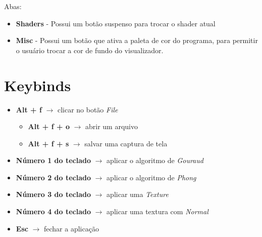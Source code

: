 \documentclass{ol-softwaremanual}
\begin{document}
Abas: 
\begin{itemize}
    \item \textbf{Shaders} - Possui um botão suspenso para 
    trocar o shader atual 
    \item \textbf{Misc} - Possui um botão que ativa a paleta de cor 
    do programa, para permitir o usuário trocar a cor 
    de fundo do visualizador.
\end{itemize}

\section{Keybinds}

\begin{itemize}
    \item \textbf{Alt + f} $\rightarrow$ clicar no botão \emph{File}
    \begin{itemize}
        \item \textbf{Alt + f + o} $\rightarrow$ abrir um arquivo 
        \item \textbf{Alt + f + s} $\rightarrow$ salvar uma captura de tela 
    \end{itemize}
    \item \textbf{Número 1 do teclado} $\rightarrow$ aplicar o algoritmo de \emph{Gouraud}
    \item \textbf{Número 2 do teclado} $\rightarrow$ aplicar o algoritmo de \emph{Phong}
    \item \textbf{Número 3 do teclado} $\rightarrow$ aplicar uma \emph{Texture}
    \item \textbf{Número 4 do teclado} $\rightarrow$ aplicar uma textura com \emph{Normal}
    \item \textbf{Esc} $\rightarrow$ fechar a aplicação
\end{itemize}
\end{document}
